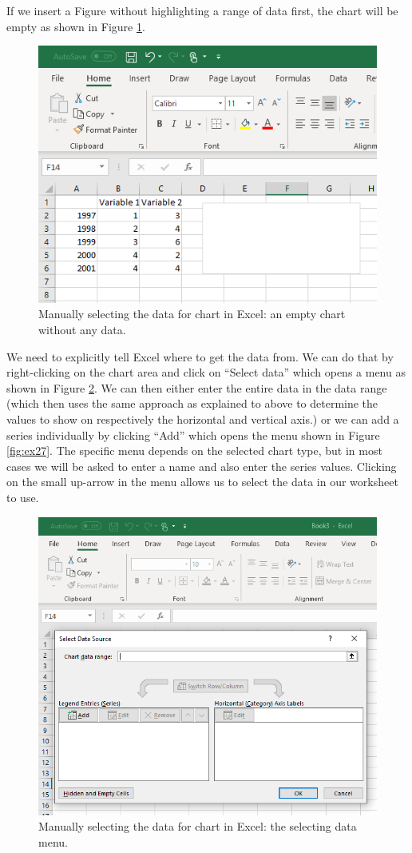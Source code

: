 \documentclass[]{book}
\begin{document}
If we insert a Figure without highlighting a range of data first, the chart will be empty as shown in Figure \ref{fig:ex25}.

\begin{figure}

{\centering \includegraphics[width=0.6\linewidth]{_resources/chapter_excelbasic/g2} 

}

\caption{Manually selecting the data for chart in Excel: an empty chart without any data.}\label{fig:ex25}
\end{figure}

We need to explicitly tell Excel where to get the data from. We can do that by right-clicking on the chart area and click on ``Select data'' which opens a menu as shown in Figure \ref{fig:ex26}. We can then either enter the entire data in the data range (which then uses the same approach as explained to above to determine the values to show on respectively the horizontal and vertical axis.) or we can add a series individually by clicking ``Add'' which opens the menu shown in Figure \ref{fig:ex27}. The specific menu depends on the selected chart type, but in most cases we will be asked to enter a name and also enter the series values. Clicking on the small up-arrow in the menu allows us to select the data in our worksheet to use.

\begin{figure}

{\centering \includegraphics[width=0.6\linewidth]{_resources/chapter_excelbasic/g3} 

}

\caption{Manually selecting the data for chart in Excel: the selecting data menu.}\label{fig:ex26}
\end{figure}
\end{document}
